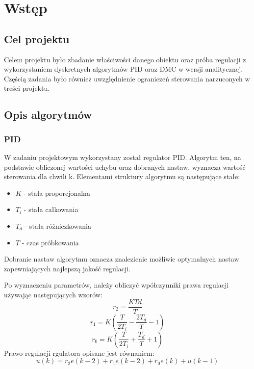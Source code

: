 \chapter{Wstęp}
\section{Cel projektu}
Celem projektu było zbadanie właściwości danego obiektu oraz próba regulacji z wykorzystaniem dyskretnych algorytmów PID oraz DMC w wersji analitycznej. Częścią zadania było również uwzględnienie ograniczeń sterowania narzuconych w treści projektu.
\section{Opis algorytmów}
\subsection{PID}
W zadaniu projektowym wykorzystany został regulator PID. Algorytm ten, na podstawie obliczonej wartości uchybu oraz dobranych nastaw, wyznacza wartość sterowania dla chwili k. Elementami struktury algorytmu są następujące stałe:
\begin{itemize}
	\item $K$ - stała proporcjonalna
	\item $T_i$ - stała całkowania
	\item $T_d$ - stała różniczkowania
	\item $T$ - czas próbkowania
\end{itemize}

Dobranie nastaw algorytmu oznacza znalezienie możliwie optymalnych nastaw zapewniających najlepszą jakość regulacji.
\par Po wyznaczeniu parametrów, należy obliczyć wpółczynniki prawa regulacji używając następujących wzorów:
\begin{equation}
    r_2 = \frac{KTd}{T}
\end{equation}
\begin{equation}
    r_1 = K(\frac{T}{2T_i}-\frac{2T_d}{T}-1)
\end{equation}
\begin{equation}
    r_0 = K(\frac{T}{2T_i}+\frac{T_d}{T}+1)
\end{equation}
Prawo regulacji rgulatora opisane jest równaniem:
\begin{equation}
    u(k) = r_2e(k-2)+r_1e(k-2)+r_0e(k) +u(k-1)
\end{equation}


